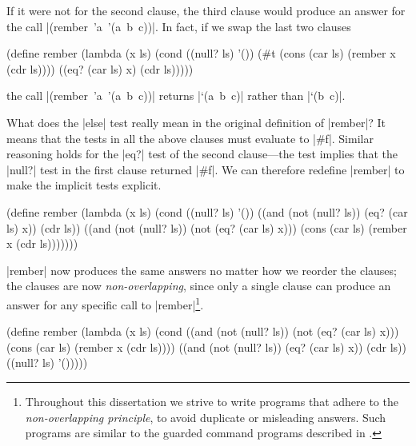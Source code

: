 \noindent If it were not for the second clause, the third clause would produce
an answer for the call \mbox{\scheme|(rember 'a '(a b c))|}.  In fact,
if we swap the last two clauses

\schemedisplayspace
\begin{schemedisplay}
(define rember
  (lambda (x ls)
    (cond
      ((null? ls) '())
      (#t (cons (car ls) (rember x (cdr ls))))
      ((eq? (car ls) x) (cdr ls)))))
\end{schemedisplay}

\noindent the call \mbox{\scheme|(rember 'a '(a b c))|} returns
\mbox{\scheme|`(a b c)|} rather than \mbox{\scheme|`(b c)|}.

What does the \mbox{\scheme|else|} test really mean in the original
definition of \scheme|rember|?  It means that the tests in all the above
clauses must evaluate to \mbox{\scheme|#f|}.  Similar reasoning holds
for the \mbox{\scheme|eq?|} test of the second clause---the test
implies that the \mbox{\scheme|null?|} test in the first clause
returned \mbox{\scheme|#f|}.  We can therefore redefine
\mbox{\scheme|rember|} to make the implicit tests explicit.

\newpage

\begin{schemedisplay}
(define rember
  (lambda (x ls)
    (cond
      ((null? ls) '())
      ((and (not (null? ls)) (eq? (car ls) x))
       (cdr ls))
      ((and (not (null? ls)) (not (eq? (car ls) x)))
       (cons (car ls) (rember x (cdr ls)))))))
\end{schemedisplay}

\mbox{\scheme|rember|} now produces the same answers no matter how we
reorder the clauses; the clauses are now \emph{non-overlapping},
since only a single clause can produce an answer for any specific call
to \mbox{\scheme|rember|}\footnote{Throughout this dissertation we strive to write programs that adhere to the \emph{non-overlapping principle}, to avoid duplicate or misleading answers.  Such programs are similar to the guarded command programs described in \citet{guardedcommands,disciplineprog}.}.

\schemedisplayspace
\begin{schemedisplay}
(define rember
  (lambda (x ls)
    (cond
      ((and (not (null? ls)) (not (eq? (car ls) x)))
       (cons (car ls) (rember x (cdr ls))))
      ((and (not (null? ls)) (eq? (car ls) x))
       (cdr ls))
      ((null? ls) '()))))
\end{schemedisplay}

